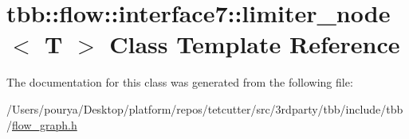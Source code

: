 \hypertarget{classtbb_1_1flow_1_1interface7_1_1limiter__node}{}\section{tbb\+:\+:flow\+:\+:interface7\+:\+:limiter\+\_\+node$<$ T $>$ Class Template Reference}
\label{classtbb_1_1flow_1_1interface7_1_1limiter__node}


The documentation for this class was generated from the following file\+:\begin{DoxyCompactItemize}
\item 
/\+Users/pourya/\+Desktop/platform/repos/tetcutter/src/3rdparty/tbb/include/tbb/\hyperlink{flow__graph_8h}{flow\+\_\+graph.\+h}\end{DoxyCompactItemize}
